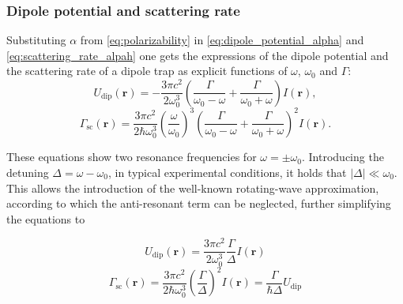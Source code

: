 \subsubsection{Dipole potential and scattering rate}
Substituting $\alpha$ from \eqref{eq:polarizability} in \eqref{eq:dipole_potential_alpha} and \eqref{eq:scattering_rate_alpah} one gets the expressions of the dipole potential and the scattering rate of a dipole trap as explicit functions of $\omega$, $\omega_0$ and $\Gamma$:
\begin{equation}
    U_{\text{dip}}(\mathbf{r}) = -\frac{3 \pi c^2}{2 \omega_0^3} \left( \frac{\Gamma}{\omega_0 - \omega} + \frac{\Gamma}{\omega_0 + \omega} \right) I(\mathbf{r}),
\end{equation}
\begin{equation}
    \Gamma_{\text{sc}}(\mathbf{r}) = \frac{3 \pi c^2}{2 \hbar \omega_0^3} \left( \frac{\omega}{\omega_0} \right)^3 \left( \frac{\Gamma}{\omega_0 - \omega} + \frac{\Gamma}{\omega_0 + \omega} \right)^2 I(\mathbf{r}).
\end{equation}

These equations show two resonance frequencies for $\omega=\pm\omega_0$. Introducing the detuning $\Delta = \omega-\omega_0$, in typical experimental conditions, it holds that $|\Delta|\ll\omega_0$. This allows the introduction of the well-known rotating-wave approximation, according to which the anti-resonant term can be neglected, further simplifying the equations to 

\begin{equation}
    \label{eq:dipole_potential}
    U_{\text{dip}}(\mathbf{r}) = \frac{3 \pi c^2}{2 \omega_0^3} \frac{\Gamma}{\Delta} I(\mathbf{r})
\end{equation}
\begin{equation}
    \label{eq:dipole_scattering}
    \Gamma_{\text{sc}}(\mathbf{r}) = \frac{3 \pi c^2}{2 \hbar \omega_0^3} \left( \frac{\Gamma}{\Delta} \right)^2 I(\mathbf{r}) = \frac{\Gamma}{\hbar\Delta}U_\text{dip}
\end{equation}

